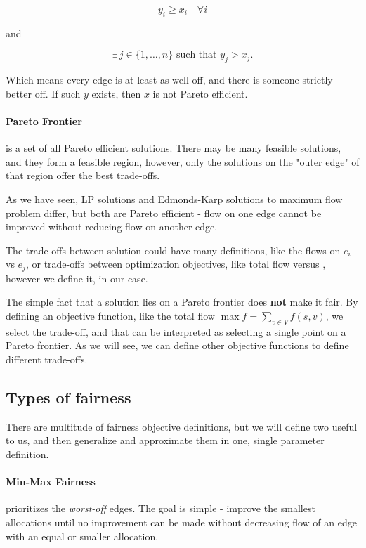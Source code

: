 \documentclass[12pt, openany]{article}
\begin{document}
\[
y_i \ge x_i \quad \forall i
\]

and

\[
\exists\, j \in \{1,\dots,n\} \text{ such that } y_j > x_j.
\]

Which means every edge is at least as well off, and there is someone strictly better off. If such $y$ exists, then $x$ is not Pareto efficient.

\paragraph{\textbf{Pareto Frontier}} is a set of all Pareto efficient solutions. There may be many feasible solutions, and they form a feasible region, however, only the solutions on the "outer edge" of that region offer the best trade-offs.

As we have seen, LP solutions and Edmonds-Karp solutions to maximum flow problem differ, but both are Pareto efficient - flow on one edge cannot be improved without reducing flow on another edge.

The trade-offs between solution could have many definitions, like the flows on $e_i$ vs $e_j$, or trade-offs between optimization objectives, like total flow versus , however we define it, in our case.

The simple fact that a solution lies on a Pareto frontier does \textbf{not} make it fair. By defining an objective function, like the total flow \( \max f = \sum_{v \in V} f(s,v) \), we select the trade-off, and that can be interpreted as selecting a single point on a Pareto frontier. As we will see, we can define other objective functions to define different trade-offs.

\subsection{Types of fairness}
There are multitude of fairness objective definitions, but we will define two useful to us, and then generalize and approximate them in one, single parameter definition.

\paragraph{\textbf{Min-Max Fairness}} prioritizes the \textit{worst-off} edges. The goal is simple - improve the smallest allocations until no improvement can be made without decreasing flow of an edge with an equal or smaller allocation.
\end{document}
